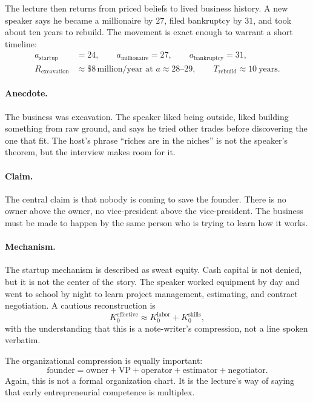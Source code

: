 The lecture then returns from priced beliefs to lived business history. A new speaker says he became a millionaire by \(27\), filed bankruptcy by \(31\), and took about ten years to rebuild. The movement is exact enough to warrant a short timeline:
\begin{align}
a_{\text{startup}} &= 24,\qquad
a_{\text{millionaire}} = 27,\qquad
a_{\text{bankruptcy}} = 31,\\
R_{\text{excavation}} &\approx \$8\,\text{million/year at } a\approx 28\text{--}29,\qquad
T_{\text{rebuild}} \approx 10\ \text{years}.
\end{align}

\paragraph{Anecdote.}
The business was excavation. The speaker liked being outside, liked building something from raw ground, and says he tried other trades before discovering the one that fit. The host's phrase ``riches are in the niches'' is not the speaker's theorem, but the interview makes room for it.

\paragraph{Claim.}
The central claim is that nobody is coming to save the founder. There is no owner above the owner, no vice-president above the vice-president. The business must be made to happen by the same person who is trying to learn how it works.

\paragraph{Mechanism.}
The startup mechanism is described as sweat equity. Cash capital is not denied, but it is not the center of the story. The speaker worked equipment by day and went to school by night to learn project management, estimating, and contract negotiation. A cautious reconstruction is
\begin{equation}
K_0^{\text{effective}} \approx K_0^{\text{labor}} + K_0^{\text{skills}},
\end{equation}
with the understanding that this is a note-writer's compression, not a line spoken verbatim.

The organizational compression is equally important:
\begin{equation}
\text{founder}
=
\text{owner}
+
\text{VP}
+
\text{operator}
+
\text{estimator}
+
\text{negotiator}.
\end{equation}
Again, this is not a formal organization chart. It is the lecture's way of saying that early entrepreneurial competence is multiplex.

